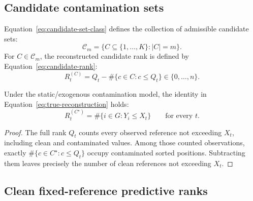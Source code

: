 \subsection{Candidate contamination sets}

Equation~\eqref{eq:candidate-set-class} defines the collection of admissible candidate sets:
\begin{equation}
\mathcal C_m
  =
  \{C\subseteq\{1,\ldots,K\}:|C|=m\}.
  \label{eq:candidate-set-class}
\end{equation}
For \(C\in\mathcal C_m\), the reconstructed candidate rank is defined by Equation~\eqref{eq:candidate-rank}:
\begin{equation}
  R_t^{(C)}
  =
  Q_t-\#\{c\in C:c\le Q_t\}
  \in\{0,\ldots,n\}.
  \label{eq:candidate-rank}
\end{equation}

\begin{lemma}
Under the static/exogenous contamination model, the identity in Equation~\eqref{eq:true-reconstruction} holds:
\begin{equation}
  R_t^{(C^\star)}
  =
  \#\{i\in G:Y_i\le X_t\}
  \qquad\text{for every }t.
  \label{eq:true-reconstruction}
\end{equation}
\end{lemma}

\begin{proof}
The full rank \(Q_t\) counts every observed reference not exceeding \(X_t\), including clean and contaminated values. Among those counted observations, exactly \(\#\{c\in C^\star:c\le Q_t\}\) occupy contaminated sorted positions. Subtracting them leaves precisely the number of clean references not exceeding \(X_t\).
\end{proof}

\subsection{Clean fixed-reference predictive ranks}

